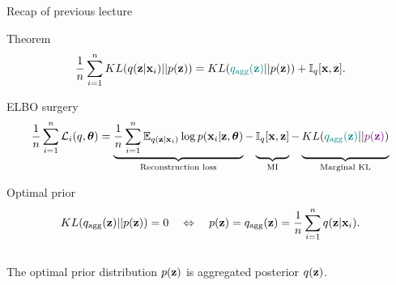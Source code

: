 \begin{frame}{Recap of previous lecture}
	\begin{block}{Theorem}
		\vspace{-0.3cm}
		\[
			\frac{1}{n} \sum_{i=1}^n KL(q(\mathbf{z} | \mathbf{x}_i) || p(\mathbf{z})) = KL({\color{teal}q_{\text{agg}}(\mathbf{z}) }|| p(\mathbf{z})) + \mathbb{I}_{q} [\mathbf{x}, \mathbf{z}].
		\]
		\vspace{-0.4cm}
	\end{block}
	\begin{block}{ELBO surgery}
		\vspace{-0.5cm}
		{\small
		\[
		    \frac{1}{n} \sum_{i=1}^n \cL_i(q, \btheta) = \underbrace{\frac{1}{n} \sum_{i=1}^n \mathbb{E}_{q(\bz | \bx_i)} \log p(\bx_i | \bz, \btheta)}_{\text{Reconstruction loss}}
		    - \underbrace{\vphantom{ \sum_{i=1}^n} \bbI_q [\bx, \bz]}_{\text{MI}} - \underbrace{\vphantom{ \sum_{i=1}^n} KL({\color{teal}q_{\text{agg}}(\bz)} || {\color{violet}p(\bz)})}_{\text{Marginal KL}}
		\]}
	\end{block}
	\vspace{-0.8cm}
	\begin{block}{Optimal prior}
		\vspace{-0.6cm}
		\[
			KL(q_{\text{agg}}(\mathbf{z}) || p(\mathbf{z})) = 0 \quad \Leftrightarrow \quad p (\mathbf{z}) = q_{\text{agg}}(\mathbf{z}) = \frac{1}{n} \sum_{i=1}^n q(\mathbf{z} | \mathbf{x}_i).
		\]
		\vspace{-0.3cm}\\
		The optimal prior distribution $p(\mathbf{z})$ is aggregated posterior $q(\mathbf{z})$.
	\end{block}
\end{frame}
